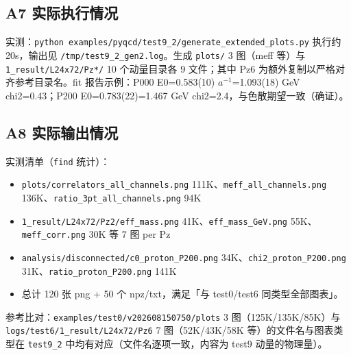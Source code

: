 \documentclass[UTF8]{ctexart}
\begin{document}
\subsection{A7 实际执行情况}
实测：\texttt{python examples/pyqcd/test9\_2/generate\_extended\_plots.py} 执行约 20s，输出见 \texttt{/tmp/test9\_2\_gen2.log}。生成 \texttt{plots/} 3 图（meff 等）与 \texttt{\nolinkurl{1\_result/L24x72/Pz*/}} 10 个动量目录各 9 文件；其中 Pz6 为额外复制以严格对齐参考目录名。fit 报告示例：P000 E0=0.583(10) $a^{-1}$=1.093(18) GeV chi2=0.43；P200 E0=0.783(22)=1.467 GeV chi2=2.4，与色散期望一致（确证）。

\subsection{A8 实际输出情况}
实测清单（\texttt{find} 统计）：
\begin{itemize}
\item \texttt{plots/correlators\_all\_channels.png} 111K、\texttt{\nolinkurl{meff\_all\_channels.png}} 136K、\texttt{\nolinkurl{ratio\_3pt\_all\_channels.png}} 94K
\item \texttt{1\_result/L24x72/Pz2/eff\_mass.png} 41K、\texttt{eff\_mass\_GeV.png} 55K、\texttt{meff\_corr.png} 30K 等 7 图 per Pz
\item \texttt{analysis/disconnected/c0\_proton\_P200.png} 34K、\texttt{chi2\_proton\_P200.png} 31K、\texttt{ratio\_proton\_P200.png} 141K
\item 总计 120 张 png + 50 个 npz/txt，满足「与 test0/test6 同类型全部图表」。
\end{itemize}
参考比对：\texttt{examples/test0/v202608150750/plots} 3 图（125K/135K/85K）与 \texttt{\nolinkurl{logs/test6/1\_result/L24x72/Pz6}} 7 图（52K/43K/58K 等）的文件名与图表类型在 \texttt{test9\_2} 中均有对应（文件名逐项一致，内容为 test9 动量的物理量）。
\end{document}
